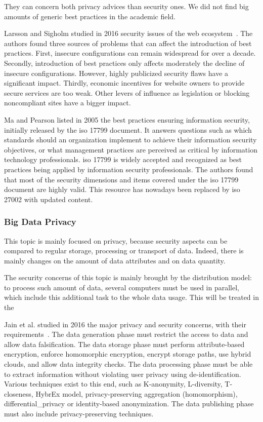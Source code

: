 They can concern both privacy advices than security ones. We did not find big amounts of generic best practices in the academic field.

Larsson and Sigholm studied in 2016 security issues of the web ecosystem~\cite{larsson_papering_2016}. The authors found three sources of problems that can affect the introduction of best practices. First, insecure configurations can remain widespread for over a decade. Secondly, introduction of best practices only affects moderately the decline of insecure configurations. However, highly publicized security flaws have a significant impact. Thirdly, economic incentives for website owners to provide secure services are too weak. Other levers of influence as legislation or blocking noncompliant sites have a bigger impact. %

Ma and Pearson \cite{ma_iso_2005} listed in 2005 the best practices ensuring information security, initially released by the \gls{iso} 17799 document. It answers questions such as which standards should an organization implement to achieve their information security objectives, or what management practices are perceived as critical by information technology professionals. \gls{iso} 17799 is widely accepted and recognized as best practices being applied by information security professionals. The authors found that most of the security dimensions and items covered under the \gls{iso} 17799 document are highly valid. This resource has nowadays been replaced by \gls{iso} 27002 with updated content. %

\subsubsection{Big Data Privacy}
\label{subsubsec:state_review_results_bigdata}

This topic is mainly focused on privacy, because security aspects can be compared to regular storage, processing or transport of data. Indeed, there is mainly changes on the amount of data attributes and on data quantity.

The security concerns of this topic is mainly brought by the distribution model: to process such amount of data, several computers must be used in parallel, which include this additional task to the whole data usage. This will be treated in the 

Jain et al. studied in 2016 the major privacy and security concerns, with their requirements~\cite{jain_big_2016}. The data generation phase must restrict the access to data and allow data falsification. The data storage phase must perform attribute-based encryption, enforce homomorphic encryption, encrypt storage paths, use hybrid clouds, and allow data integrity checks. The data processing phase must be able to extract information without violating user privacy using de-identification. Various techniques exist to this end, such as K-anonymity, L-diversity, T-closeness, HybrEx model, privacy-preserving aggregation (homomorphism), \gls{differential_privacy} or identity-based anonymization. The data publishing phase must also include privacy-preserving techniques. %

